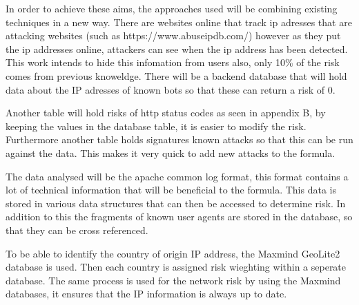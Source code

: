 In order to achieve these aims, the approaches used will be combining existing techniques in a new way. There are websites online that track ip adresses that are attacking websites (such as https://www.abuseipdb.com/) however as they put the ip addresses online, attackers can see when the ip address has been detected. This work intends to hide this infomation from users also, only 10\% of the risk comes from previous knoweldge. There will be a backend database that will hold data about the IP adresses of known bots so that these can return a risk of 0. 

Another table will hold risks of http status codes as  seen in appendix B, by keeping the values in the database table, it is easier to modify the risk. Furthermore another table holds signatures known attacks so that this can be run against the data. This makes it very quick to add new attacks to the formula.

The data analysed will be the apache common log format, this format contains a lot of technical information that will be beneficial to the formula. This data is stored in various data structures that can then be accessed to determine risk. In addition to this the fragments of known user agents are stored in the database, so that they can be cross referenced.  

To be able to identify the country of origin IP address, the Maxmind GeoLite2 database is used. Then each country is assigned risk wieghting within a seperate database. The same process is used for the network risk by using the Maxmind databases, it ensures that the IP information is always up to date.